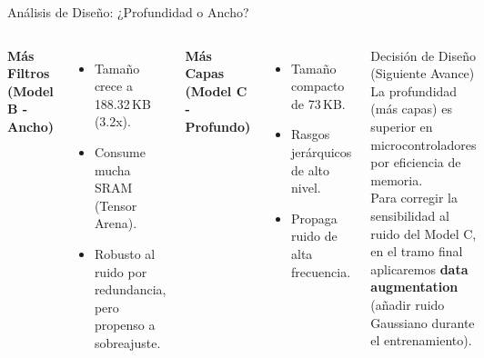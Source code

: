 \documentclass[aspectratio=169, 10pt]{beamer}
\begin{document}
\begin{frame}{Análisis de Diseño: ¿Profundidad o Ancho?}
    \begin{columns}[T]
        \footnotesize
        \textbf{Más Filtros (Model B - Ancho)}
        \begin{itemize}\itemsep0.10cm
            \item Tamaño crece a 188.32\,KB (3.2x).
            \item Consume mucha SRAM (Tensor Arena).
            \item Robusto al ruido por redundancia, pero propenso a sobreajuste.
        \end{itemize}
        \vspace{0.15cm}
        \textbf{Más Capas (Model C - Profundo)}
        \begin{itemize}\itemsep0.10cm
            \item Tamaño compacto de 73\,KB.
            \item Rasgos jerárquicos de alto nivel.
            \item Propaga ruido de alta frecuencia.
        \end{itemize}
        \footnotesize
        \begin{alertblock}{Decisión de Diseño (Siguiente Avance)}
            La profundidad (más capas) es superior en microcontroladores por eficiencia de memoria. \\
            \vspace{0.15cm}
            Para corregir la sensibilidad al ruido del Model C, en el tramo final aplicaremos \textbf{data augmentation} (a\~nadir ruido Gaussiano durante el entrenamiento).
        \end{alertblock}
    \end{columns}
\end{frame}
\end{document}
